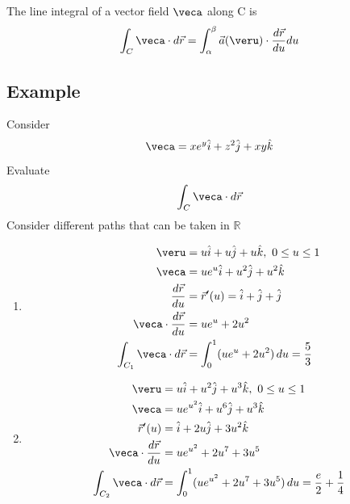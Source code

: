 \documentclass[a4paper, 11pt, normalem]{report}
\begin{document}
The line integral of a vector field $\veca$ along C is
\begin{equation*}
    \int_C \veca \cdot d\vec{r} = \int_{\alpha}^{\beta} \vec{a}(\veru) \cdot \frac{d\vec{r}}{du}du
\end{equation*}

\subsection{Example}
Consider
\begin{equation*}
    \veca = xe^y \hat{i} + z^2 \hat{j} + xy\hat{k}
\end{equation*}
Evaluate
\begin{equation*}
    \int_C \veca \cdot d\vec{r}
\end{equation*}
Consider different paths that can be taken in $\mathbb{R}$
\begin{enumerate}
    \item
            \begin{align*}
                \veru &= u\hat{i} + u\hat{j} + u\hat{k},~ 0 \leq u \leq 1 \\
                \veca &= ue^u \hat{i} + u^2 \hat{j} + u^2 \hat{k} \\
                \frac{d\vec{r}}{du} &= \vec{r}'(u) = \hat{i} + \hat{j} + \hat{j} \\
                \veca \cdot \frac{d\vec{r}}{du} &= ue^u + 2u^2 \\
                \int_{C_1} \veca \cdot d\vec{r} &= \int_{0}^{1} (ue^u + 2u^2)\,du = \frac{5}{3}
            \end{align*}
    \item
            \begin{align*}
                \veru &= u\hat{i} + u^2 \hat{j} + u^3 \hat{k},~ 0 \leq u \leq 1 \\
                \veca &= ue^{u^2}\hat{i} + u^6 \hat{j} + u^3 \hat{k} \\
                \vec{r}'(u) &= \hat{i} + 2u\hat{j} + 3u^2 \hat{k} \\
                \veca \cdot \frac{d\vec{r}}{du} &= ue^{u^2} + 2u^7 + 3u^5 \\
                \int_{C_2} \veca \cdot d\vec{r} &= \int_{0}^{1} (ue^{u^2} + 2u^7 + 3u^5)\,du = \frac{e}{2} + \frac{1}{4}
            \end{align*}
\end{enumerate}
\end{document}
